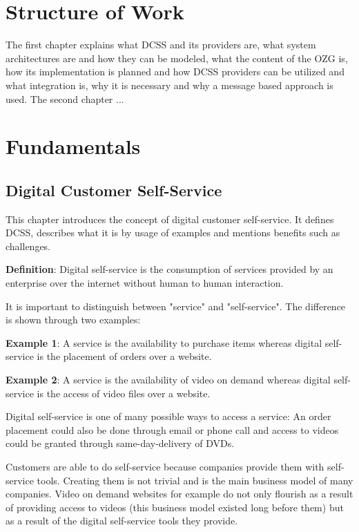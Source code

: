 \documentclass[
     12pt,         %
     a4paper,      %
     BCOR=10mm,version=first,     %
     DIV=14,version=first,        %
     ]{scrreprt}
\begin{document}
\chapter{Structure of Work}

The first chapter explains what DCSS and its providers are, what system architectures are and how they can be modeled, what the content of the OZG is, how its implementation is planned and how DCSS providers can be utilized and what integration is, why it is necessary and why a message based approach is used. The second chapter ...

\chapter{Fundamentals}

\section{Digital Customer Self-Service}
This chapter introduces the concept of digital customer self-service. It defines DCSS, describes what it is by usage of examples and mentions benefits such as challenges.

\textbf{Definition}: Digital self-service is the consumption of services provided by an enterprise over the internet without human to human interaction.

It is important to distinguish between "service" and "self-service". The difference is shown through two examples:

\textbf{Example 1}: A service is the availability to purchase items whereas digital self-service is the placement of orders over a website.

\textbf{Example 2}: A service is the availability of video on demand whereas digital self-service is the access of video files over a website.

Digital self-service is one of many possible ways to access a service: An order placement could also be done through email or phone call and access to videos could be granted through same-day-delivery of DVDs.

Customers are able to do self-service because companies provide them with self-service tools. Creating them is not trivial and is the main business model of many companies. Video on demand websites for example do not only flourish as a result of providing access to videos (this business model existed long before them) but as a result of the digital self-service tools they provide.
\end{document}
